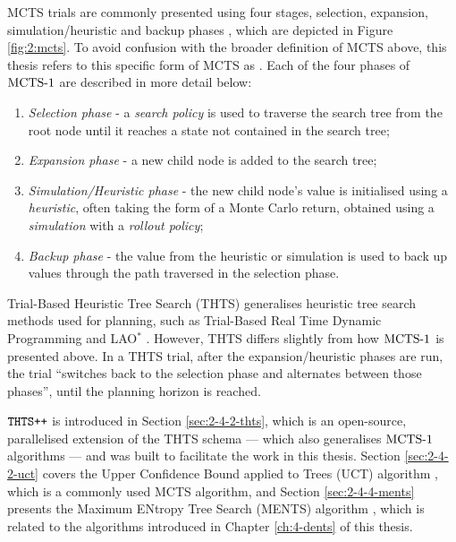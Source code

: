     MCTS trials are commonly presented using four stages, selection, expansion, simulation/heuristic and backup phases \cite{mcts_survey}, which are depicted in Figure \ref{fig:2:mcts}. To avoid confusion with the broader definition of MCTS above, this thesis refers to this specific form of MCTS as \mctsone. Each of the four phases of ${\textnormal{MCTS-1}}$ are described in more detail below: 
    \begin{enumerate}
        \item \textit{Selection phase} - a \textit{search policy} is used to traverse the search tree from the root node until it reaches a state not contained in the search tree;
        \item \textit{Expansion phase} - a new child node is added to the search tree;
        \item \textit{Simulation/Heuristic phase} - the new child node's value is initialised using a \textit{heuristic}, often taking the form of a Monte Carlo return, obtained using a \textit{simulation} with a \textit{rollout policy}; 
        \item \textit{Backup phase} - the value from the heuristic or simulation is used to back up values through the path traversed in the selection phase.
    \end{enumerate}

    Trial-Based Heuristic Tree Search (THTS) \cite{thts,thts_thesis} generalises heuristic tree search methods used for planning, such as Trial-Based Real Time Dynamic Programming \cite{rtdp} and LAO$^*$ \cite{lao_star}. However, THTS differs slightly from how ${\textnormal{MCTS-1}}$ is presented above. In a THTS trial, after the expansion/heuristic phases are run, the trial ``switches back to the selection phase and alternates between those phases'', until the planning horizon is reached.

    ${\textnormal{\texttt{THTS++}}}$ \cite{thtspp} is introduced in Section \ref{sec:2-4-2-thts}, which is an open-source, parallelised extension of the THTS schema --- which also generalises ${\textnormal{MCTS-1}}$ algorithms --- and was built to facilitate the work in this thesis. Section \ref{sec:2-4-2-uct} covers the Upper Confidence Bound applied to Trees (UCT) algorithm \cite{uct,uct_long}, which is a commonly used MCTS algorithm, and Section \ref{sec:2-4-4-ments} presents the Maximum ENtropy Tree Search (MENTS) algorithm \cite{ments}, which is related to the algorithms introduced in Chapter \ref{ch:4-dents} of this thesis.
    
    


